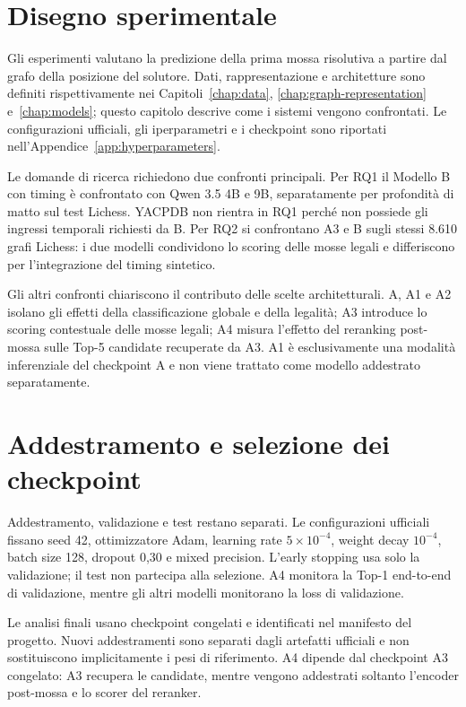 \label{chap:methodology}

\section{Disegno sperimentale}

Gli esperimenti valutano la predizione della prima mossa risolutiva a partire dal
grafo della posizione del solutore. Dati, rappresentazione e architetture sono
definiti rispettivamente nei Capitoli~\ref{chap:data},
\ref{chap:graph-representation} e~\ref{chap:models}; questo capitolo descrive come
i sistemi vengono confrontati. Le configurazioni ufficiali, gli iperparametri e i
checkpoint sono riportati nell'Appendice~\ref{app:hyperparameters}.

Le domande di ricerca richiedono due confronti principali. Per RQ1 il Modello B con
timing è confrontato con Qwen 3.5 4B e 9B, separatamente per profondità di matto sul
test Lichess. YACPDB non rientra in RQ1 perché non possiede gli ingressi temporali
richiesti da B. Per RQ2 si confrontano A3 e B sugli stessi 8.610 grafi Lichess: i
due modelli condividono lo scoring delle mosse legali e differiscono per
l'integrazione del timing sintetico.

Gli altri confronti chiariscono il contributo delle scelte architetturali. A, A1 e
A2 isolano gli effetti della classificazione globale e della legalità; A3 introduce
lo scoring contestuale delle mosse legali; A4 misura l'effetto del reranking
post-mossa sulle Top-5 candidate recuperate da A3. A1 è esclusivamente una modalità
inferenziale del checkpoint A e non viene trattato come modello addestrato
separatamente.

\section{Addestramento e selezione dei checkpoint}

Addestramento, validazione e test restano separati. Le configurazioni ufficiali
fissano seed 42, ottimizzatore Adam, learning rate \(5\times10^{-4}\), weight decay
\(10^{-4}\), batch size 128, dropout 0,30 e mixed precision. L'early stopping usa
solo la validazione; il test non partecipa alla selezione. A4 monitora la Top-1
end-to-end di validazione, mentre gli altri modelli monitorano la loss di
validazione.

Le analisi finali usano checkpoint congelati e identificati nel manifesto del
progetto. Nuovi addestramenti sono separati dagli artefatti ufficiali e non
sostituiscono implicitamente i pesi di riferimento. A4 dipende dal checkpoint A3
congelato: A3 recupera le candidate, mentre vengono addestrati soltanto l'encoder
post-mossa e lo scorer del reranker.

